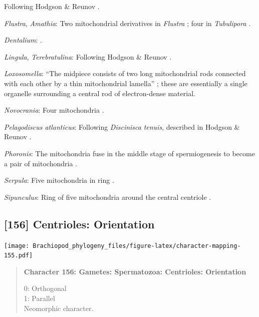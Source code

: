 \documentclass[openany]{book}
\begin{document}
Following Hodgson \& Reunov \citeyearpar{Hodgson1994Ultrastructureof}.

\hypertarget{Amathia-coding-155}{}
\emph{Flustra}, \emph{Amathia}: Two mitochondrial derivatives in
\emph{Flustra} \citep{Franzen1981, Franzen1977}; four in
\emph{Tubulipora} \citep{Franzen1984}.

\hypertarget{Dentalium-coding-155}{}
\emph{Dentalium}: \citet{DufresneDube1983}.

\hypertarget{Lingula-coding-155}{}
\emph{Lingula}, \emph{Terebratulina}: Following Hodgson \& Reunov
\citeyearpar{Hodgson1994Ultrastructureof}.

\hypertarget{Loxosomella-coding-155}{}
\emph{Loxosomella}: ``The midpiece consists of two long mitochondrial
rods connected with each other by a thin mitochondrial lamella''
\citep[in \emph{Loxosoma}]{Franzen2000}; these are essentially a single
organelle surrounding a central rod of electron-dense material.

\hypertarget{Novocrania-coding-155}{}
\emph{Novocrania}: Four mitochondria \citep{Afzelius1978Finestructure}.

\hypertarget{Pelagodiscus_atlanticus-coding-155}{}
\emph{Pelagodiscus atlanticus}: Following \emph{Discinisca}
\emph{tenuis}, described in Hodgson \& Reunov
\citeyearpar{Hodgson1994Ultrastructureof}.

\hypertarget{Phoronis-coding-155}{}
\emph{Phoronis}: The mitochondria fuse in the middle stage of
spermiogenesis to become a pair of mitochondria
\citep{Reunov2004Ultrastructuralstudy}.

\hypertarget{Serpula-coding-155}{}
\emph{Serpula}: Five mitochondria in ring \citep{Gherardi2011}.

\hypertarget{Sipunculus-coding-155}{}
\emph{Sipunculus}: Ring of five mitochondria around the central
centriole \citep{Rice1993}.

\subsection*{{[}156{]} Centrioles:
Orientation}\label{centrioles-orientation}

\texttt{[image: Brachiopod\_phylogeny\_files/figure-latex/character-mapping-155.pdf]}

\begin{quote}
\textbf{Character 156: Gametes: Spermatozoa: Centrioles: Orientation}

0: Orthogonal\\
1: Parallel\\
Neomorphic character.
\end{quote}
\end{document}
